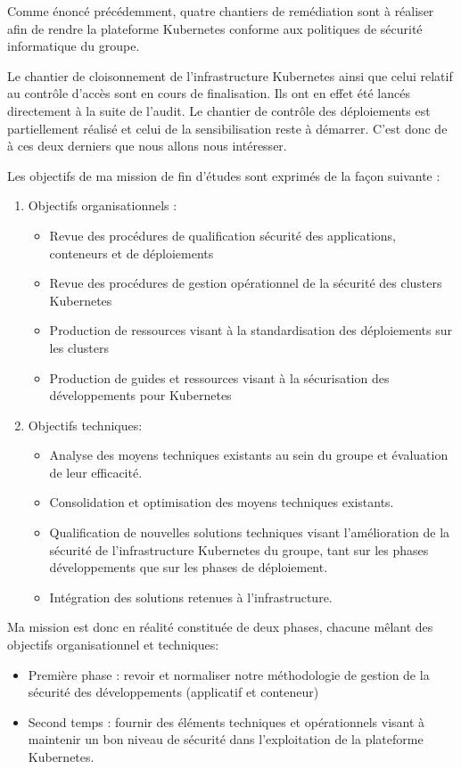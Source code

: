 Comme énoncé précédemment, quatre chantiers de remédiation sont à réaliser afin de rendre la plateforme Kubernetes conforme aux politiques
de sécurité informatique du groupe.

Le chantier de cloisonnement de l'infrastructure Kubernetes ainsi que celui relatif au contrôle d'accès sont en cours de 
finalisation. Ils ont en effet été lancés directement à la suite de l'audit.
\linebreak Le chantier de contrôle des déploiements est partiellement réalisé et celui de la sensibilisation reste à démarrer. C'est donc 
de à ces deux derniers que nous allons nous intéresser.

Les objectifs de ma mission de fin d'études sont exprimés de la façon suivante :
\begin{enumerate}
    \item Objectifs organisationnels : 
    \begin{itemize}
        \item Revue des procédures de qualification sécurité des applications, conteneurs et de déploiements
        \item Revue des procédures de gestion opérationnel de la sécurité des clusters Kubernetes
        \item Production de ressources visant à la standardisation des déploiements sur les clusters
        \item Production de guides et ressources visant à la sécurisation des développements pour Kubernetes
    \end{itemize}
    \item Objectifs techniques:
    \begin{itemize}
        \item Analyse des moyens techniques existants au sein du groupe et évaluation de leur efficacité.
        \item Consolidation et optimisation des moyens techniques existants.
        \item Qualification de nouvelles solutions techniques visant l’amélioration de la sécurité de l’infrastructure Kubernetes du  groupe, 
        tant sur les phases développements que sur les phases de déploiement.
        \item Intégration des solutions retenues à l’infrastructure. 
    \end{itemize}
\end{enumerate}

Ma mission est donc en réalité constituée de deux phases, chacune mêlant des objectifs organisationnel et techniques:
\begin{itemize}
    \item Première phase : revoir et normaliser notre méthodologie de gestion de la sécurité des développements (applicatif et conteneur)
    \item Second temps : fournir des éléments techniques et opérationnels visant à maintenir un bon niveau de sécurité dans l'exploitation 
    de la plateforme Kubernetes. 
\end{itemize}

